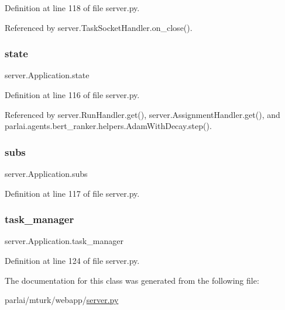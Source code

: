 Definition at line 118 of file server.\+py.



Referenced by server.\+Task\+Socket\+Handler.\+on\+\_\+close().

\mbox{\label{classserver_1_1Application_a57fbb350ff0dc7289d430daf94ad0c23}} 
\subsubsection{\texorpdfstring{state}{state}}
{\footnotesize\ttfamily server.\+Application.\+state}



Definition at line 116 of file server.\+py.



Referenced by server.\+Run\+Handler.\+get(), server.\+Assignment\+Handler.\+get(), and parlai.\+agents.\+bert\+\_\+ranker.\+helpers.\+Adam\+With\+Decay.\+step().

\mbox{\label{classserver_1_1Application_acb95f86301de18782a4757d4adc6184c}} 
\subsubsection{\texorpdfstring{subs}{subs}}
{\footnotesize\ttfamily server.\+Application.\+subs}



Definition at line 117 of file server.\+py.

\mbox{\label{classserver_1_1Application_a493229eae400f5ed7e51fc53d3426691}} 
\subsubsection{\texorpdfstring{task\+\_\+manager}{task\_manager}}
{\footnotesize\ttfamily server.\+Application.\+task\+\_\+manager}



Definition at line 124 of file server.\+py.



The documentation for this class was generated from the following file\+:\begin{DoxyCompactItemize}
\item 
parlai/mturk/webapp/\hyperlink{server_8py}{server.\+py}\end{DoxyCompactItemize}
